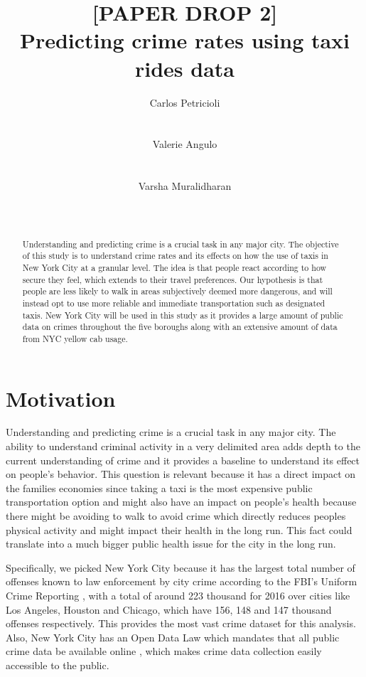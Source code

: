 \documentclass{sigkddExp}
\title{[PAPER DROP 2]\\
Predicting crime rates using taxi rides data}
\author{
\alignauthor Carlos Petricioli \\
       \affaddr{New York University}\\
       \affaddr{New York, USA}\\
       \email{petricioli@nyu.edu}
\alignauthor Valerie Angulo\\
       \affaddr{New York University}\\
       \affaddr{New York, USA}\\
       \email{vaa238@nyu.edu}
\alignauthor Varsha Muralidharan \\
       \affaddr{New York University}\\
       \affaddr{New York, USA}\\
       \email{vm1370@nyu.edu}
}
\begin{document}
\maketitle

\begin{abstract}

Understanding and predicting crime is a crucial task in any major city. The objective of this study is to understand crime rates and its effects on how the use of taxis in New York City at a granular level. The idea  is that people react according to how secure they feel, which extends to their travel preferences. 
Our hypothesis is that people are less likely to walk in areas subjectively deemed more dangerous, and will instead opt to use more reliable and immediate transportation such as designated taxis. 
New York City will be used in this study as it provides a large amount of public data on crimes throughout the five boroughs along with an extensive amount of data from NYC yellow cab usage. 


\end{abstract}




\section{Motivation}

Understanding and predicting crime is a crucial task in any major city. 
The ability to understand criminal activity in a very delimited area adds depth to the current understanding of crime and  it provides a baseline to understand its effect on people's behavior. 
This question is relevant because it has a direct impact on the families economies since taking a taxi is the most expensive public transportation option and might also have an impact on people's health because there might be avoiding to walk to avoid crime which directly reduces peoples physical activity and might impact their health in the long run. 
This fact could translate into a much bigger public health issue for the city in the long run. %


Specifically, we picked New York City because it has the largest  total number of offenses known to law enforcement by city crime according to the FBI's Uniform Crime Reporting \cite{fbiUniformCrime}, with a total of around 223 thousand for 2016 over cities like Los Angeles, Houston and Chicago, which have 156, 148 and
147 thousand offenses respectively. 
This provides the most vast crime dataset for this analysis.
Also, New York City has an Open Data Law which mandates that all public crime data be available online \cite{OpenDat}, which makes crime data collection easily accessible to the public.
\end{document}
